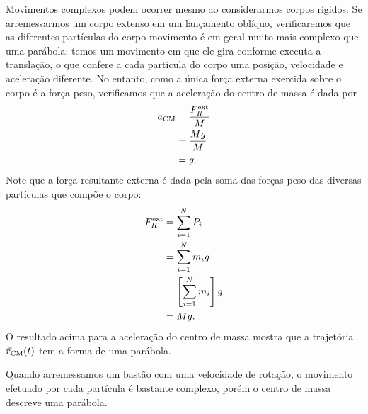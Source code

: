 Movimentos complexos podem ocorrer mesmo ao considerarmos corpos rígidos. Se arremessarmos um corpo extenso em um lançamento oblíquo, verificaremos que as diferentes partículas do corpo movimento é em geral muito mais complexo que uma parábola: temos um movimento em que ele gira conforme executa a translação, o que confere a cada partícula do corpo uma posição, velocidade e aceleração diferente. No entanto, como a única força externa exercida sobre o corpo é a força peso, verificamos que a aceleração do centro de massa é dada por
\begin{align}
    a_{\rm{CM}} &= \frac{F_R^{\rm{ext}}}{M} \\
    &= \frac{Mg}{M} \\
    &= g.
\end{align}
%
Note que a força resultante externa é dada pela soma das forças peso das diversas partículas que compõe o corpo:
\begin{align}
    F_R^{\rm{ext}} &= \sum_{i=1}^N P_i \\
    &= \sum_{i=1}^N m_i g \\
    &= \left[\sum_{i=1}^N m_i\right] g \\
    &= M g.
\end{align}
%
O resultado acima para a aceleração do centro de massa mostra que a trajetória $\vec{r}_{\rm{CM}}(t)$ tem a forma de uma parábola.

\begin{marginfigure}
\centering
{}
\caption{Quando arremessamos um bastão com uma velocidade de rotação, o movimento efetuado por cada partícula é bastante complexo, porém o centro de massa descreve uma parábola.}
\end{marginfigure}

